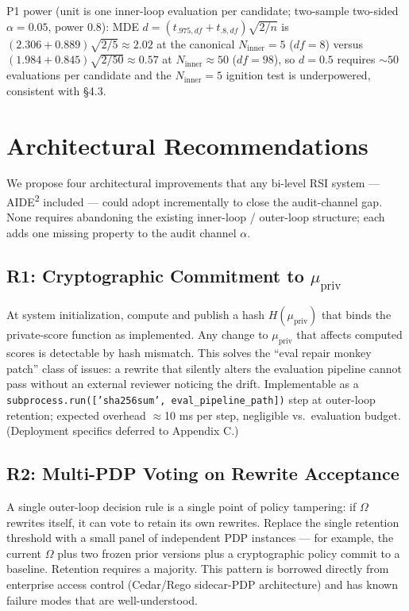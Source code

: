 \documentclass{article}
\theoremstyle{definition}
\begin{document}
P1 power (unit is one inner-loop evaluation per candidate; two-sample two-sided $\alpha{=}0.05$, power $0.8$): MDE $d{=}(t_{.975,df}{+}t_{.8,df})\sqrt{2/n}$ is $(2.306{+}0.889)\sqrt{2/5}{\approx}2.02$ at the canonical $N_{\mathrm{inner}}{=}5$ ($df{=}8$) versus $(1.984{+}0.845)\sqrt{2/50}{\approx}0.57$ at $N_{\mathrm{inner}}{\approx}50$ ($df{=}98$), so $d{=}0.5$ requires ${\sim}50$ evaluations per candidate and the $N_{\mathrm{inner}}{=}5$ ignition test is underpowered, consistent with \S4.3.

\section{Architectural Recommendations}

We propose four architectural improvements that any bi-level RSI system --- AIDE\textsuperscript{2} included --- could adopt incrementally to close the audit-channel gap. None requires abandoning the existing inner-loop / outer-loop structure; each adds one missing property to the audit channel $\alpha$.

\subsection{R1: Cryptographic Commitment to $\mu_{\text{priv}}$}

At system initialization, compute and publish a hash $H(\mu_{\text{priv}})$ that binds the private-score function as implemented. Any change to $\mu_{\text{priv}}$ that affects computed scores is detectable by hash mismatch. This solves the ``eval repair monkey patch'' class of issues: a rewrite that silently alters the evaluation pipeline cannot pass without an external reviewer noticing the drift. Implementable as a \texttt{subprocess.run(['sha256sum', eval\_pipeline\_path])} step at outer-loop retention; expected overhead $\approx$10 ms per step, negligible vs.\ evaluation budget. (Deployment specifics deferred to Appendix C.)

\subsection{R2: Multi-PDP Voting on Rewrite Acceptance}

A single outer-loop decision rule is a single point of policy tampering: if $\Omega$ rewrites itself, it can vote to retain its own rewrites. Replace the single retention threshold with a small panel of independent PDP instances --- for example, the current $\Omega$ plus two frozen prior versions plus a cryptographic policy commit to a baseline. Retention requires a majority. This pattern is borrowed directly from enterprise access control (Cedar/Rego sidecar-PDP architecture) and has known failure modes that are well-understood.
\end{document}
